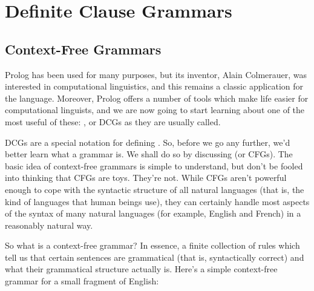 
\chapter{Definite Clause Grammars}\label{CHAPTER7}





\section{Context-Free Grammars}\label{SEC.L7.CFG}

Prolog has been used for many purposes, but its inventor, Alain
Colmerauer, was interested in computational linguistics, and this
remains a classic application for the language.  Moreover, Prolog
offers a number of tools which make life easier for computational
linguists, and we are now going to start learning about one of the
most useful of these: , or DCGs as
they are usually called.

 DCGs are a special notation for defining .  So,
before we go any further, we'd better learn what a grammar is.  We
shall do so by discussing  (or CFGs).
The basic idea of context-free grammars is simple to understand, but
don't be fooled into thinking that CFGs are toys.  They're not.  While
CFGs aren't powerful enough to cope with the syntactic structure of
all natural languages (that is, the kind of languages that human
beings use), they can certainly handle most aspects of the syntax of
many natural languages (for example, English and French) in a
reasonably natural way.

 So what is a context-free grammar?  In essence, a finite
collection of rules which tell us that certain sentences are
grammatical (that is, syntactically correct) and what their
grammatical structure actually is.  Here's a simple context-free
grammar for a small fragment of English:


